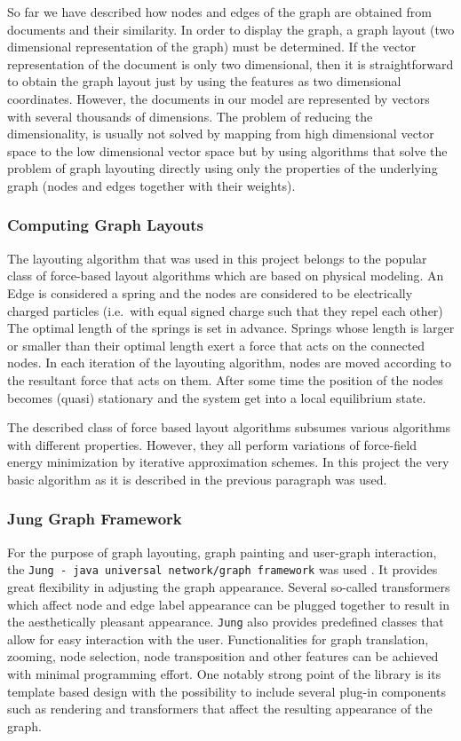 So far we have described how nodes and edges of the graph are obtained from documents and their
similarity. In order to display the graph, a graph layout (two dimensional representation of the
graph) must be determined. If the vector representation of the document is only two dimensional,
then it is straightforward to obtain the graph layout just by using the features as two dimensional
coordinates. However, the documents in our model are represented by vectors with several thousands
of dimensions. The problem of reducing the dimensionality, is usually not solved by mapping
from high dimensional vector space to the low dimensional vector space but by using algorithms that
solve the problem of graph layouting directly using only the properties of the underlying graph
(nodes and edges together with their weights).

\subsubsection{Computing Graph Layouts}
The layouting algorithm that was used in this project belongs to the popular class of force-based
layout algorithms which are based on physical modeling. An Edge is considered a spring and
the nodes are considered to be electrically charged particles (i.e.\ with equal signed charge such
that they repel each other) The optimal length of the springs is set in advance. Springs whose
length is larger or smaller than their optimal length exert a force that acts on the connected
nodes. In each iteration of the layouting algorithm, nodes are moved according to the resultant
force
that acts on them. After some time the position of the nodes becomes (quasi) stationary and the
system get into a local equilibrium state.

The described class of force based layout algorithms subsumes various algorithms with different
properties. However, they all perform variations of force-field energy minimization by iterative
approximation schemes. In this project the very basic algorithm as it is described in the previous
paragraph was used.

\subsubsection{Jung Graph Framework}
For the purpose of graph layouting, graph painting and user-graph interaction, the
\texttt{Jung - java universal network/graph framework} was used \cite{jung}. It provides great
flexibility in adjusting the graph appearance. Several so-called transformers which affect node and
edge label appearance can be plugged together to result in the aesthetically pleasant appearance.
\texttt{Jung} also provides predefined classes that allow for easy interaction with the user.
Functionalities for graph translation, zooming, node selection, node transposition and other
features can be achieved with minimal programming effort. One notably strong point of the library is
its template based design with the possibility to include several plug-in components such as
rendering and transformers that affect the resulting appearance of the graph.

